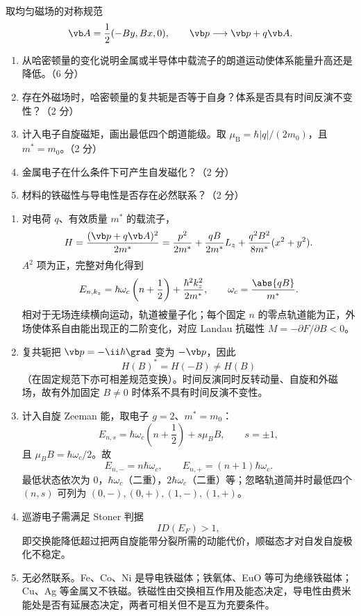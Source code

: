 \begin{question}[14 分]
取均匀磁场的对称规范
\[
 \vb A=\frac12(-By,Bx,0),
 \qquad \vb p\longrightarrow\vb p+q\vb A.
\]
\begin{enumerate}
  \item 从哈密顿量的变化说明金属或半导体中载流子的朗道运动使体系能量升高还是降低。（6 分）
  \item 存在外磁场时，哈密顿量的复共轭是否等于自身？体系是否具有时间反演不变性？（2 分）
  \item 计入电子自旋磁矩，画出最低四个朗道能级。取 $\mu_{\mathrm B}=\hbar|q|/(2m_0)$，且 $m^*=m_0$。（2 分）
  \item 金属电子在什么条件下可产生自发磁化？（2 分）
  \item 材料的铁磁性与导电性是否存在必然联系？（2 分）
\end{enumerate}


\begin{solution}
\begin{enumerate}
  \item 对电荷 $q$、有效质量 $m^*$ 的载流子，
  \[
    H=\frac{(\vb p+q\vb A)^2}{2m^*}
    =\frac{p^2}{2m^*}+\frac{qB}{2m^*}L_z
    +\frac{q^2B^2}{8m^*}(x^2+y^2).
  \]
  $A^2$ 项为正，完整对角化得到
  \[
    E_{n,k_z}=\hbar\omega_c\left(n+\frac12\right)
    +\frac{\hbar^2k_z^2}{2m^*},
    \qquad \omega_c=\frac{\abs{qB}}{m^*}.
  \]
  相对于无场连续横向运动，轨道被量子化；每个固定 $n$ 的零点轨道能为正，外场使体系自由能出现正的二阶变化，对应 Landau 抗磁性
  $M=-\partial F/\partial B<0$。
  \item 复共轭把 $\vb p=-\ii\hbar\grad$ 变为 $-\vb p$，因此
  \[
    H(B)^*=H(-B)\ne H(B)
  \]
  （在固定规范下亦可相差规范变换）。时间反演同时反转动量、自旋和外磁场，故有外加固定 $B\ne0$ 时体系不具有时间反演不变性。
  \item 计入自旋 Zeeman 能，取电子 $g=2$、$m^*=m_0$：
  \[
    E_{n,s}=\hbar\omega_c\left(n+\frac12\right)+s\mu_BB,
    \qquad s=\pm1,
  \]
  且 $\mu_BB=\hbar\omega_c/2$。故
  \[
    E_{n,-}=n\hbar\omega_c,
    \qquad E_{n,+}=(n+1)\hbar\omega_c.
  \]
  最低状态依次为 $0$，$\hbar\omega_c$（二重），$2\hbar\omega_c$（二重）等；忽略轨道简并时最低四个 $(n,s)$ 可列为
  $(0,-),(0,+),(1,-),(1,+)$。
  \item 巡游电子需满足 Stoner 判据
  \[
    \boxed{I D(E_F)>1,}
  \]
  即交换能降低超过把两自旋能带分裂所需的动能代价，顺磁态才对自发自旋极化不稳定。
  \item 无必然联系。Fe、Co、Ni 是导电铁磁体；铁氧体、EuO 等可为绝缘铁磁体；Cu、Ag 等金属又不铁磁。铁磁性由交换相互作用及能态决定，导电性由费米能处是否有延展态决定，两者可相关但不是互为充要条件。
\end{enumerate}
\end{solution}
\end{question}


